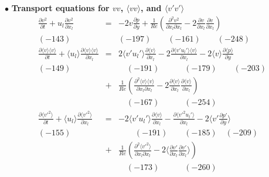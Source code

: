 \documentclass[a4paper,11pt]{article}
\begin{document}
\noindent $\bullet$  \textbf{Transport equations for $vv$, $\langle vv\rangle$, and $\langle v'v'\rangle$}
\begin{eqnarray}
\frac{\partial v^2 }{\partial t}
+u_l\frac{\partial v^2 }{\partial x_l}
&=&-2v\frac{\partial p }{\partial y}
+\frac{1}{Re}(\frac{\partial^2 v^2 }{\partial x_l\partial x_l}-2\frac{\partial v }{\partial x_l}\frac{\partial v }{\partial x_l}) \\
(-143) &&(-197) \quad{}  \quad{} (-161) \quad{} \quad{} (-248)\nonumber \\
\frac{\partial \langle v\rangle \langle v\rangle }{\partial t}
+\langle u_l\rangle \frac{\partial \langle v\rangle \langle v\rangle }{\partial x_l}
&=&2\langle v'u_l'\rangle \frac{\partial \langle v \rangle}{\partial x_l}
-2\frac{\partial \langle v'u_l'\rangle \langle v \rangle }{\partial x_l}
-2\langle v\rangle \frac{\partial \langle p\rangle }{\partial y} \nonumber \\
(-149) \quad{}&&\quad{} (-191) \quad{} \qquad{} (-179)  \quad{} \quad{} (-203)\nonumber \\
&+&\frac{1}{Re}(\frac{\partial^2 \langle v\rangle \langle v \rangle}{\partial x_l\partial x_l}-2\frac{\partial \langle v\rangle }{\partial x_l} \frac{\partial \langle v\rangle }{\partial x_l}) \\
&&\quad{}(-167) \quad{} \qquad{} (-254) \nonumber \\
\frac{\partial \langle v'^2\rangle }{\partial t}
+\langle u_l\rangle \frac{\partial \langle v'^2\rangle }{\partial x_l}
&=&-2\langle v'u_l'\rangle \frac{\partial \langle v \rangle  }{\partial x_l}
-\frac{\partial \langle v'^2u_l'\rangle}{\partial x_l}
-2\langle v' \frac{\partial  p' }{\partial y}\rangle \nonumber \\
(-155)\quad{} &&\quad{}\quad{} (-191) \quad{} \quad{} (-185)  \quad{} (-209) \nonumber \\
&+&\frac{1}{Re}(\frac{\partial^2 \langle v'^2 \rangle}{\partial x_l\partial x_l}-2\langle \frac{\partial  v' }{\partial x_l}\frac{\partial  v' }{\partial x_l}\rangle) \\
&&\quad{} (-173) \qquad{} \quad{}(-260) \nonumber
\end{eqnarray}
\end{document}
